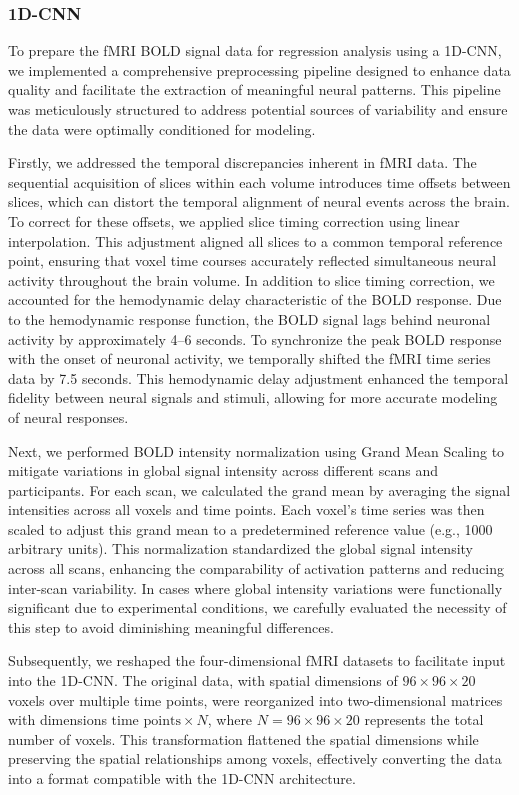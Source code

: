 \documentclass[a4paper]{article}
\begin{document}
\subsubsection{\textbf{1D-CNN}}

To prepare the fMRI BOLD signal data for regression analysis using a 1D-CNN, we implemented a comprehensive preprocessing pipeline designed to enhance data quality and facilitate the extraction of meaningful neural patterns. This pipeline was meticulously structured to address potential sources of variability and ensure the data were optimally conditioned for modeling.

Firstly, we addressed the temporal discrepancies inherent in fMRI data. The sequential acquisition of slices within each volume introduces time offsets between slices, which can distort the temporal alignment of neural events across the brain. To correct for these offsets, we applied slice timing correction using linear interpolation. This adjustment aligned all slices to a common temporal reference point, ensuring that voxel time courses accurately reflected simultaneous neural activity throughout the brain volume. In addition to slice timing correction, we accounted for the hemodynamic delay characteristic of the BOLD response. Due to the hemodynamic response function, the BOLD signal lags behind neuronal activity by approximately 4–6 seconds. To synchronize the peak BOLD response with the onset of neuronal activity, we temporally shifted the fMRI time series data by 7.5 seconds. This hemodynamic delay adjustment enhanced the temporal fidelity between neural signals and stimuli, allowing for more accurate modeling of neural responses.

Next, we performed BOLD intensity normalization using Grand Mean Scaling to mitigate variations in global signal intensity across different scans and participants. For each scan, we calculated the grand mean by averaging the signal intensities across all voxels and time points. Each voxel's time series was then scaled to adjust this grand mean to a predetermined reference value (e.g., 1000 arbitrary units). This normalization standardized the global signal intensity across all scans, enhancing the comparability of activation patterns and reducing inter-scan variability. In cases where global intensity variations were functionally significant due to experimental conditions, we carefully evaluated the necessity of this step to avoid diminishing meaningful differences.

Subsequently, we reshaped the four-dimensional fMRI datasets to facilitate input into the 1D-CNN. The original data, with spatial dimensions of \(96 \times 96 \times 20\) voxels over multiple time points, were reorganized into two-dimensional matrices with dimensions \(\text{time points} \times N\), where \(N = 96 \times 96 \times 20\) represents the total number of voxels. This transformation flattened the spatial dimensions while preserving the spatial relationships among voxels, effectively converting the data into a format compatible with the 1D-CNN architecture.
\end{document}
